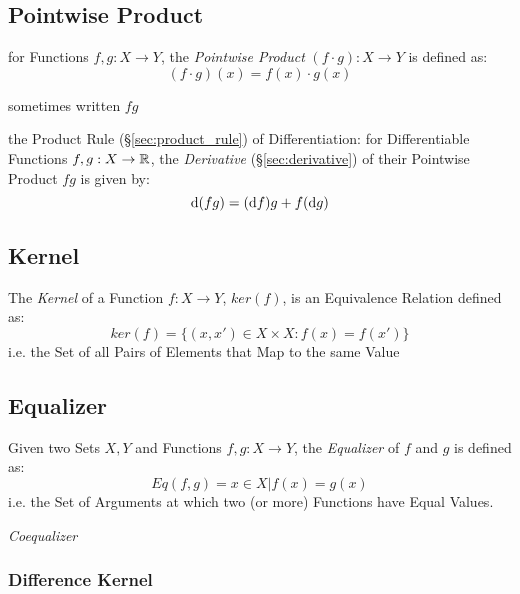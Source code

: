 \subsection{Pointwise Product}\label{sec:pointwise_product}

for Functions $f, g : X \to Y$, the \emph{Pointwise Product}
$(f\cdot{g}) : X \to Y$ is defined as:
\[
  (f \cdot g)(x) = f(x) \cdot g(x)
\]

sometimes written $fg$

the Product Rule (\S\ref{sec:product_rule}) of Differentiation: for
Differentiable Functions $f, g : X \to \mathbb{R}$, the \emph{Derivative}
(\S\ref{sec:derivative}) of their Pointwise Product $fg$ is given by:
\[
  \mathrm{d}(fg) = (\mathrm{d}f)g + f(\mathrm{d}g)
\]



\subsection{Kernel}\label{sec:function_kernel}

The \emph{Kernel} of a Function $f : X \to Y$, $ker(f)$, is an
Equivalence Relation defined as:
\[
  ker(f) = \{ (x,x') \in X \times X : f(x) = f(x') \}
\]
i.e. the Set of all Pairs of Elements that Map to the same Value



\subsection{Equalizer}\label{sec:function_equalizer}

Given two Sets $X,Y$ and Functions $f,g : X \to Y$, the
\emph{Equalizer} of $f$ and $g$ is defined as:
\[
  Eq(f,g) = { x \in X | f(x) = g(x) }
\]
i.e. the Set of Arguments at which two (or more) Functions have Equal
Values.


\emph{Coequalizer}



\subsubsection{Difference Kernel}\label{sec:difference_equalizer}

